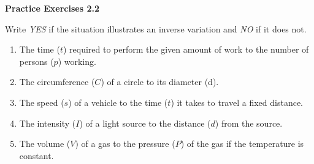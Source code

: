  \vspace{1ex}
\noindent\textbf{Practice Exercises 2.2}

\vspace{0.75ex}

Write \emph{YES} if the situation illustrates an inverse variation and \emph{NO} if it does not.

\begin{enumerate}[noitemsep, label = \color{blue}\arabic*. ]
   \item The time ($t$) required to perform the given amount of work to the number of persons ($p$) working.
   \item The circumference ($C$) of a circle to its diameter (d).
  \item The speed ($s$) of a vehicle to the time ($t$) it takes to travel a fixed distance.
   \item The intensity ($I$) of a light source to the distance ($d$) from the source.
   \item The volume ($V$) of a gas to the pressure ($P$) of the gas if the temperature is constant.
\end{enumerate}
				
				
